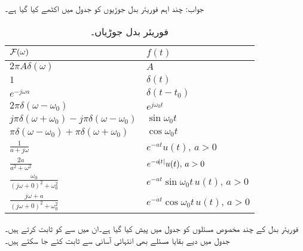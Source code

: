جواب:
چند اہم فوریئر بدل جوڑیوں کو جدول  میں اکٹھے کیا گیا ہے۔
\begin{table}
\caption{فوریئر بدل جوڑیاں۔}
\label{جدول_فوریئر_بدل_جوڑیاں}
\centering
\begin{tabular}{l l}
$\mathcal{F}(\omega)$ & $f(t)$ \Bstrut \\
\hline
$2\pi A \delta(\omega)$&$A$ \Tstrut \\[2ex]
$1$&$\delta(t)$\\[1ex]
$e^{-j\omega a}$&$\delta(t-t_0)$\\[1ex]
 $2\pi \delta(\omega-\omega_0)$ &$e^{j\omega_0 t}$ \\[1ex]
 $j\pi \delta(\omega+\omega_0)-j\pi\delta(\omega-\omega_0)$ &$\sin \omega_0 t$ \\[1ex]
 $\pi \delta(\omega-\omega_0)+\pi\delta(\omega+\omega_0)$ &$\cos \omega_0 t$ \\[1ex]
 $\frac{1}{a+j\omega}$&$e^{-at}u(t), \, a>0$  \\[1ex]
 $\frac{2a}{a^2+\omega^2}$&$e^{-a\abs{t}}u(t), \, a>0 $  \\[1ex]
 $\frac{\omega_0}{(j\omega+0)^2+\omega_0^2}$ &$e^{-at} \sin \omega_0 t\, u(t), \, a>0$ \\[1ex]
 $\frac{j\omega+a}{(j\omega+0)^2+\omega_0^2}$ &$e^{-at} \cos \omega_0 t\, u(t), \, a>0$ 
\end{tabular}
\end{table}

فوریئر بدل کے چند مخصوص مسئلوں کو جدول  میں پیش کیا گیا ہے۔ان میں سے  کو ثابت کرتے ہیں۔جدول میں دیے بقایا مسئلے بھی انتہائی آسانی سے ثابت کئے جا سکتے ہیں۔
 
